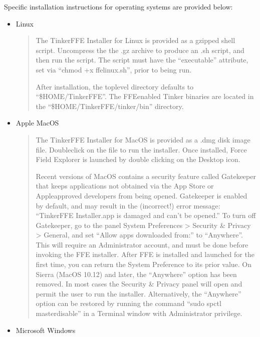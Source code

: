 \documentclass[letterpaper,11pt,english]{sphinxmanual}
\begin{document}
Specific installation instructions for operating systems are provided below:
\begin{itemize}
\item {} 
Linux
\begin{quote}

The Tinker\sphinxhyphen{}FFE Installer for Linux is provided as a gzipped shell script. Uncompress the the .gz archive to produce an .sh script, and then run the script. The script must have the “executable” attribute, set via “chmod +x ffe\sphinxhyphen{}linux.sh”, prior to being run.

After installation, the top\sphinxhyphen{}level directory defaults to “\$HOME/Tinker\sphinxhyphen{}FFE”. The FFE\sphinxhyphen{}enabled Tinker binaries are located in the “\$HOME/Tinker\sphinxhyphen{}FFE/tinker/bin” directory.
\end{quote}

\item {} 
Apple MacOS
\begin{quote}

The Tinker\sphinxhyphen{}FFE Installer for MacOS is provided as a .dmg disk image file. Double\sphinxhyphen{}click on the file to run the installer. Once installed, Force Field Explorer is launched by double clicking on the Desktop icon.

Recent versions of MacOS contains a security feature called Gatekeeper that keeps applications not obtained via the App Store or Apple\sphinxhyphen{}approved developers from being opened. Gatekeeper is enabled by default, and may result in the (incorrect!) error message: “Tinker\sphinxhyphen{}FFE Installer.app is damaged and can’t be opened.” To turn off Gatekeeper, go to the panel System Preferences \textgreater{} Security \& Privacy \textgreater{} General, and set “Allow apps downloaded from:” to “Anywhere”. This will require an Administrator account, and must be done before invoking the FFE installer. After FFE is installed and launched for the first time, you can return the System Preference to its prior value. On Sierra (MacOS 10.12) and later, the “Anywhere” option has been removed. In most cases the Security \& Privacy panel will open and permit the user to run the installer. Alternatively, the “Anywhere” option can be restored by running the command “sudo spctl \textendash{}master\sphinxhyphen{}disable” in a Terminal window with Administrator privilege.
\end{quote}

\item {} 
Microsoft Windows
\begin{quote}


\end{quote}
\end{itemize}
\end{document}

